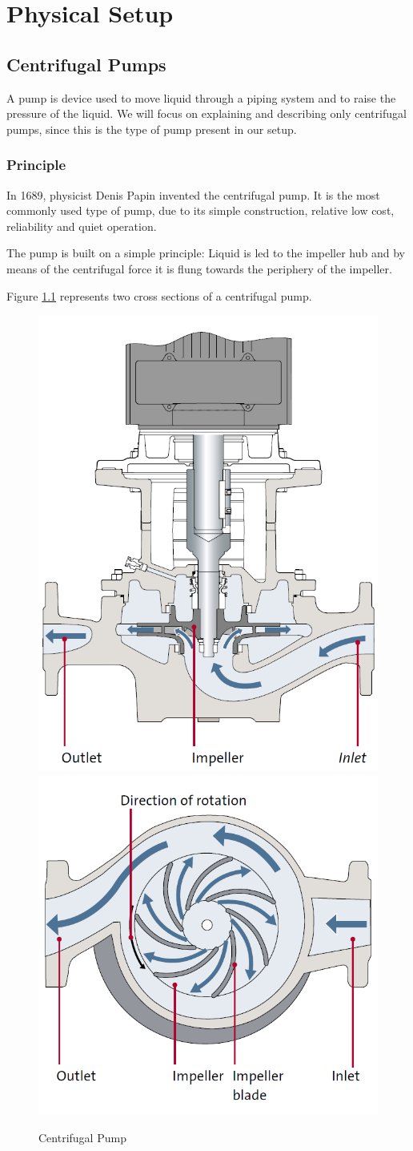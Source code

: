 \chapter{Physical Setup}\label{ch:physsetup}
\section{Centrifugal Pumps}

A pump is device used to move liquid through a piping system and to 
raise the pressure of the liquid. We will focus on explaining 
and describing only centrifugal pumps,
since this is the type of pump present in our setup. 

\subsection{Principle}

In 1689, physicist Denis Papin invented the centrifugal pump. 
It is the most commonly used type of pump, due to its simple construction,
relative low cost, reliability and quiet operation.

The pump is built on a simple principle: Liquid is led to the impeller hub
and by means of the centrifugal force it is flung towards the periphery of 
the impeller. 

Figure \ref{fig:pump_sections} represents two cross sections of a centrifugal pump.
\begin{figure}[h]
    \centering
    \includegraphics[width=0.3\linewidth]{figures/pump_cross_section.PNG}
    \qquad
    \hfill
    \includegraphics[width=0.3\linewidth]{figures/pump_above_view.PNG}
    \caption{Centrifugal Pump}
    \label{fig:pump_sections}
\end{figure}
\newpage

